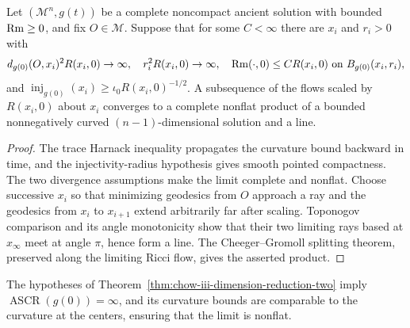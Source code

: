 \begin{theorem}
\label{thm:chow-iii-dimension-reduction-two}

Let \((\mathcal M^n,g(t))\) be a complete noncompact ancient solution with
bounded \(\operatorname{Rm}\ge0\), and fix \(O\in\mathcal M\).  Suppose that for some
\(C<\infty\) there are \(x_i\) and \(r_i>0\) with
\[
 d_{g(0)}(O,x_i)^2R(x_i,0)\to\infty,
 \quad r_i^2R(x_i,0)\to\infty,
 \quad \operatorname{Rm}(\cdot,0)\le CR(x_i,0)\ \text{on }B_{g(0)}(x_i,r_i),
\]
and \(\operatorname{inj}_{g(0)}(x_i)\ge\iota_0R(x_i,0)^{-1/2}\).  A
subsequence of the flows scaled by \(R(x_i,0)\) about \(x_i\) converges to a
complete nonflat product of a bounded nonnegatively curved
\((n-1)\)-dimensional solution and a line.
\end{theorem}
\begin{proof}
\sketch The trace Harnack inequality propagates the curvature bound backward in time,
and the injectivity-radius hypothesis gives smooth pointed compactness.  The
two divergence assumptions make the limit complete and nonflat.  Choose
successive \(x_i\) so that minimizing geodesics from \(O\) approach a ray and
the geodesics from \(x_i\) to \(x_{i+1}\) extend arbitrarily far after scaling.
Toponogov comparison and its angle monotonicity show that their two limiting
rays based at \(x_\infty\) meet at angle \(\pi\), hence form a line.  The
Cheeger--Gromoll splitting theorem, preserved along the limiting Ricci flow,
gives the asserted product.
\end{proof}

\begin{remark}
\label{rem:chow-iii-dimension-reduction-infinite-ascr}


The hypotheses of Theorem~\ref{thm:chow-iii-dimension-reduction-two} imply
\(\operatorname{ASCR}(g(0))=\infty\), and its curvature bounds are comparable
to the curvature at the centers, ensuring that the limit is nonflat.
\end{remark}

